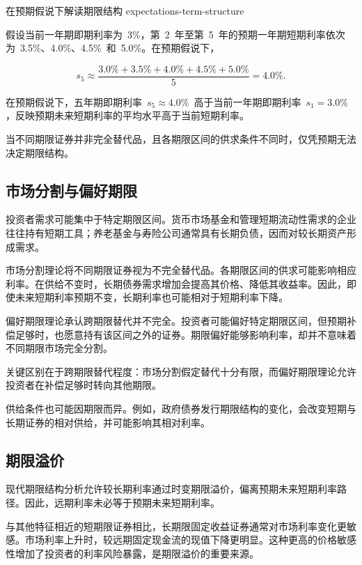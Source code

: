 \begin{example}{在预期假说下解读期限结构} {expectations-term-structure}

假设当前一年期即期利率为~3\%，第~2~年至第~5~年的预期一年期短期利率依次为~3.5\%、4.0\%、4.5\%~和~5.0\%。在预期假说下，

\[
s_5
\approx
\frac{
3.0\%+3.5\%+4.0\%+4.5\%+5.0\%
}{5}
=
4.0\%.
\]

在预期假说下，五年期即期利率~\(s_5\approx4.0\%\)~高于当前一年期即期利率~\(s_1=3.0\%\)，反映预期未来短期利率的平均水平高于当前短期利率。

\end{example}

当不同期限证券并非完全替代品，且各期限区间的供求条件不同时，仅凭预期无法决定期限结构。

\subsection{市场分割与偏好期限}

投资者需求可能集中于特定期限区间。货币市场基金和管理短期流动性需求的企业往往持有短期工具；养老基金与寿险公司通常具有长期负债，因而对较长期资产形成需求。

市场分割理论将不同期限证券视为不完全替代品。各期限区间的供求可能影响相应利率。在供给不变时，长期债券需求增加会提高其价格、降低其收益率。因此，即使未来短期利率预期不变，长期利率也可能相对于短期利率下降。

偏好期限理论承认跨期限替代并不完全。投资者可能偏好特定期限区间，但预期补偿足够时，也愿意持有该区间之外的证券。期限偏好能够影响利率，却并不意味着不同期限市场完全分割。

关键区别在于跨期限替代程度：市场分割假定替代十分有限，而偏好期限理论允许投资者在补偿足够时转向其他期限。

供给条件也可能因期限而异。例如，政府债券发行期限结构的变化，会改变短期与长期证券的相对供给，并可能影响其相对利率。

\subsection{期限溢价}

现代期限结构分析允许较长期利率通过时变期限溢价，偏离预期未来短期利率路径。因此，远期利率未必等于预期未来短期利率。

与其他特征相近的短期限证券相比，长期限固定收益证券通常对市场利率变化更敏感。市场利率上升时，较远期固定现金流的现值下降更明显。这种更高的价格敏感性增加了投资者的利率风险暴露，是期限溢价的重要来源。


